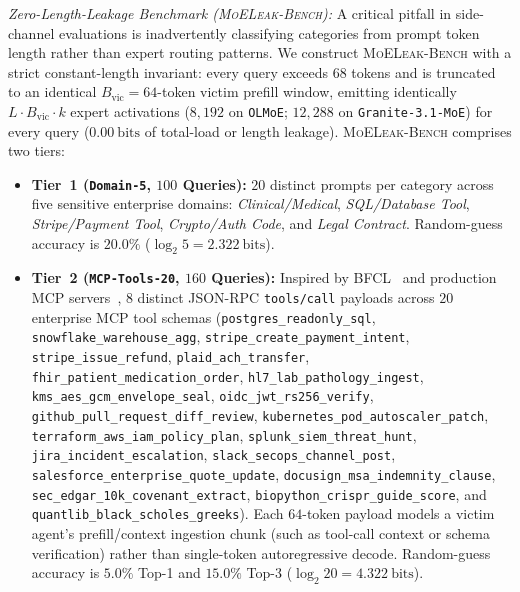 \documentclass[10pt,journal,compsoc]{IEEEtran}
\theoremstyle{definition}
\theoremstyle{remark}
\newcommand{\MLB}{\textsc{MoELeak-Bench}}
\begin{document}
\emph{Zero-Length-Leakage Benchmark (\MLB{}):} A critical pitfall in side-channel evaluations is inadvertently classifying categories from prompt token length rather than expert routing patterns. We construct \MLB{} with a strict constant-length invariant: every query exceeds $68$ tokens and is truncated to an identical $B_{\mathrm{vic}} = 64$-token victim prefill window, emitting identically $L \cdot B_{\mathrm{vic}} \cdot k$ expert activations ($8{,}192$ on \texttt{OLMoE}; $12{,}288$ on \texttt{Granite-3.1-MoE}) for every query ($0.00~\mathrm{bits}$ of total-load or length leakage). \MLB{} comprises two tiers:
\begin{itemize}
  \item \textbf{Tier~1 (\texttt{Domain-5}, $100$ Queries):} $20$ distinct prompts per category across five sensitive enterprise domains: \emph{Clinical/Medical}, \emph{SQL/Database Tool}, \emph{Stripe/Payment Tool}, \emph{Crypto/Auth Code}, and \emph{Legal Contract}. Random-guess accuracy is $20.0\%$ ($\log_2 5 = 2.322~\mathrm{bits}$).
  \item \textbf{Tier~2 (\texttt{MCP-Tools-20}, $160$ Queries):} Inspired by BFCL~\cite{patil2024bfcl} and production MCP servers~\cite{anthropic2024mcp}, $8$ distinct JSON-RPC \texttt{tools/call} payloads across $20$ enterprise MCP tool schemas (\texttt{postgres\_readonly\_sql}, \texttt{snowflake\_warehouse\_agg}, \texttt{stripe\_create\_payment\_intent}, \texttt{stripe\_issue\_refund}, \texttt{plaid\_ach\_transfer}, \texttt{fhir\_patient\_medication\_order}, \texttt{hl7\_lab\_pathology\_ingest}, \texttt{kms\_aes\_gcm\_envelope\_seal}, \texttt{oidc\_jwt\_rs256\_verify}, \texttt{github\_pull\_request\_diff\_review}, \texttt{kubernetes\_pod\_autoscaler\_patch}, \texttt{terraform\_aws\_iam\_policy\_plan}, \texttt{splunk\_siem\_threat\_hunt}, \texttt{jira\_incident\_escalation}, \texttt{slack\_secops\_channel\_post}, \texttt{salesforce\_enterprise\_quote\_update}, \texttt{docusign\_msa\_indemnity\_clause}, \texttt{sec\_edgar\_10k\_covenant\_extract}, \texttt{biopython\_crispr\_guide\_score}, and \texttt{quantlib\_black\_scholes\_greeks}). Each $64$-token payload models a victim agent's prefill/context ingestion chunk (such as tool-call context or schema verification) rather than single-token autoregressive decode. Random-guess accuracy is $5.0\%$ Top-1 and $15.0\%$ Top-3 ($\log_2 20 = 4.322~\mathrm{bits}$).
\end{itemize}
\end{document}

